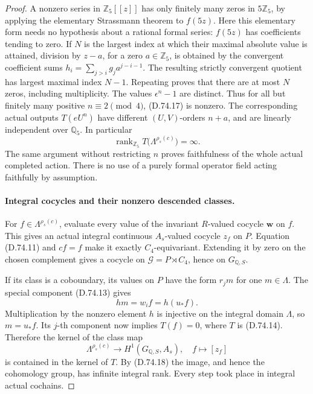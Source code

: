 \begin{proof}
A nonzero series in \(\mathbb Z_5[[z]]\) has only
finitely many zeros in \(5\mathbb Z_5\), by applying
the elementary Strassmann theorem to \(f(5z)\).
Here this elementary form needs no hypothesis about
a rational formal series: \(f(5z)\) has coefficients
tending to zero. If \(N\) is the largest index at
which their maximal absolute value is attained,
division by \(z-a\), for a zero \(a\in\mathbb Z_5\),
is obtained by the convergent coefficient sums
\(h_i=\sum_{j>i}g_j a^{j-i-1}\). The resulting
strictly convergent quotient has largest maximal
index \(N-1\). Repeating proves that there are
at most \(N\) zeros, including multiplicity.
The values \(\epsilon^n-1\) are distinct. Thus for
all but finitely many positive \(n\equiv2\pmod4\),
(D.74.17) is nonzero. The corresponding actual
outputs \(T(eU^n)\) have different
\((U,V)\)-orders \(n+a\), and are linearly
independent over \(\mathbb Q_5\). In particular
\[
 \operatorname{rank}_{\mathbb Z_5}
          T\bigl(\Lambda^{\rho_s(c)}\bigr)=\infty.
                                                        \tag{D.74.18}
\]
The same argument without restricting \(n\) proves
faithfulness of the whole actual completed action.
There is no use of a purely formal operator field
acting faithfully by assumption.

\paragraph{Integral cocycles and their nonzero descended classes.}
For \(f\in\Lambda^{\rho_s(c)}\), evaluate every value
of the invariant \(R\)-valued cocycle \(\mathbf w\)
on \(f\). This gives an actual integral continuous
\(A_s\)-valued cocycle \(z_f\) on \(P\).
Equation (D.74.11) and \(c f=f\) make it exactly
\(C_4\)-equivariant. Extending it by zero on the
chosen complement gives a cocycle on
\(\mathcal G=P\rtimes C_4\), hence on
\(G_{\mathbb Q,S}\).

If its class is a coboundary, its values on \(P\)
have the form \(r_j m\) for one \(m\in\Lambda\).
The special component (D.74.13) gives
\[
                   h m=w_i f=h(u_*f).
 \]
Multiplication by the nonzero element \(h\) is
injective on the integral domain \(\Lambda\), so
\(m=u_*f\). Its \(j\)-th component now implies
\(T(f)=0\), where \(T\) is (D.74.14).
Therefore the kernel of the class map
\[
 \Lambda^{\rho_s(c)}\longrightarrow
                  H^1(G_{\mathbb Q,S},A_s),\quad
                       f\longmapsto[z_f]
 \]
is contained in the kernel of \(T\). By (D.74.18)
the image, and hence the cohomology group, has
infinite integral rank. Every step took place in
integral actual cochains.


\end{proof}
